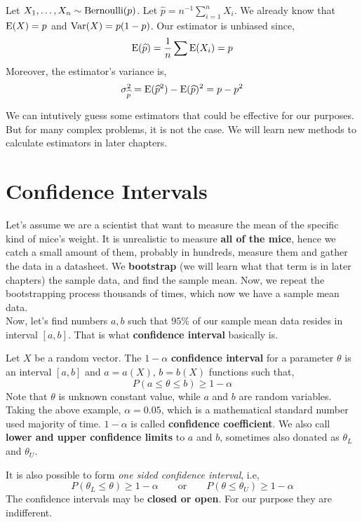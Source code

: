 \begin{example}
    Let $X_1, \ldots ,X_n \sim \operatorname{Bernoulli}(p)$. Let $\widehat{p} = n^{-1}\sum_{i=1}^n X_i$. We already know that ${\operatorname{E}}(X) = p$ and ${\operatorname{Var}}(X) = p(1-p)$.  Our estimator is unbiased since,
    \[ {\operatorname{E}}( \widehat{p}) = \frac{1}{n} \sum {\operatorname{E}}(X_i) = p\]
    Moreover, the estimator's variance is, 
    \[ \sigma_{\widehat{p}}^2 = {\operatorname{E}}(\widehat{p}^2) - {\operatorname{E}}(\widehat{p})^2 = p - p^2 \]
\end{example}
We can intutively guess some estimators that could be effective for our purposes. But for many complex problems, it is not the case. We will learn new methods to calculate estimators in later chapters.
\section{Confidence Intervals}
Let's assume we are a scientist that want to measure the mean of the specific kind of mice's weight.
It is unrealistic to measure \textbf{all of the mice}, hence we catch a small amount of them, probably in hundreds, measure them and gather the data in a datasheet. We \textbf{bootstrap} (we will learn what that term is in later chapters) the sample data, and find the sample mean. Now, we repeat the bootstrapping process thousands of times, which now we have a sample mean data.
\\
Now, let's find numbers $a,b$ such that $95\%$ of our sample mean data resides in interval $[a,b]$. That is what \textbf{confidence interval} basically is.
\begin{definition}
    Let $X$ be a random vector. The $1 - \alpha$ \textbf{confidence interval} for a parameter $\theta$ is an interval $[a,b]$ and $a = a(X)$, $b = b(X)$ functions such that,
    \[ P(a \le \theta \le b) \ge  1 - \alpha \]
    Note that $\theta$ is unknown constant value, while  $a$ and $b$ are random variables. 
   \\
   Taking the above example, $\alpha = 0.05$, which is a mathematical standard number used majority of time. $1 - \alpha$ is called \textbf{confidence coefficient}. We also call \textbf{lower and upper confidence limits} to $a$ and $b$, sometimes also donated as $\theta_{L}$ and $\theta_{U}$.
\end{definition}
It is also possible to form \textit{one sided confidence interval}, i.e,
\[ P( \theta_{L} \le \theta ) \ge 1 - \alpha  \qquad \text{or} \qquad P( \theta \le \theta_{U}) \ge 1 - \alpha\]
The confidence intervals may be \textbf{closed or open}. For our purpose they are indifferent. 



